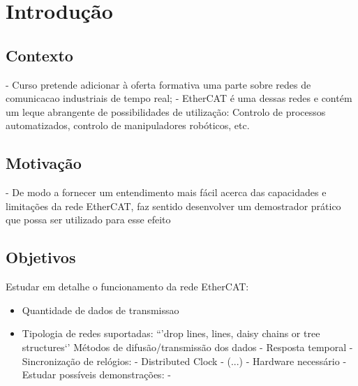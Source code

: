 \chapter{Introdução} \label{chap:intro}



\section{Contexto} \label{sec:contexto}

- Curso pretende adicionar à oferta formativa uma parte sobre redes de comunicacao industriais de tempo real;
- EtherCAT é uma dessas redes e contém um leque abrangente de possibilidades de utilização: Controlo de processos automatizados, controlo de manipuladores robóticos, etc.


\section{Motivação} \label{sec:motivacao}

- De modo a fornecer um entendimento mais fácil acerca das capacidades e limitações da rede EtherCAT, faz sentido desenvolver um demostrador prático que possa ser utilizado para esse efeito


\section{Objetivos} \label{sec:objetivos}
Estudar em detalhe o funcionamento da rede EtherCAT:

\begin{itemize}
\item Quantidade de dados de transmissao
\item Tipologia de redes suportadas:
    \subitem ``'drop lines, lines, daisy chains or tree structures`'
    \subitem Métodos de difusão/transmissão dos dados
    - Resposta temporal
    - Sincronização de relógios:
        - Distributed Clock
        - (...)
    - Hardware necessário
- Estudar possíveis demonstrações:
- 
\end{itemize}







